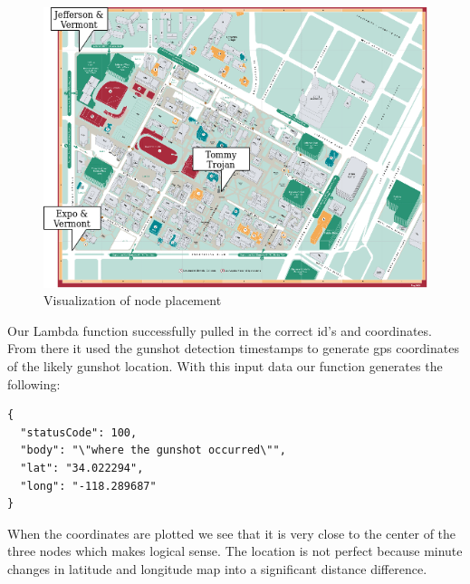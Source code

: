 \documentclass[conference]{IEEEtran}
\begin{document}
\begin{figure}[htbp]
\centerline{\includegraphics[width=0.9\columnwidth]{nodes_usc.png}}
\caption{Visualization of node placement}
\label{fig}
\end{figure}

Our Lambda function successfully pulled in the  correct id's and coordinates. From there it used the gunshot detection timestamps to generate gps coordinates of the likely gunshot location. With this input data our function generates the following:


\begin{small}
\begin{verbatim}
{
  "statusCode": 100,
  "body": "\"where the gunshot occurred\"",
  "lat": "34.022294",
  "long": "-118.289687"
}
\end{verbatim}
\end{small}

When the coordinates are plotted we see that it is very close to the center of the three nodes which makes logical sense. The location is not perfect because minute changes in latitude and longitude map into a significant distance difference.

%




\end{document}
